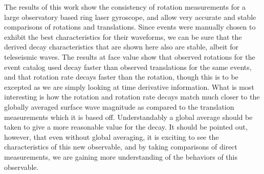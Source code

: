 \documentclass{gji}
\begin{document}
The results of this work show the consistency of rotation measurements for a large observatory based ring laser gyroscope, and allow very accurate and stable comparisons of rotations and translations. Since events were manually chosen to exhibit the best characteristics for their waveforms, we can be sure that the derived decay characteristics that are shown here also are stable, albeit for teleseismic waves. The results at face value show that observed rotations for the event catalog used decay faster than observed translations for the same events, and that rotation rate decays faster than the rotation, though this is to be excepted as we are simply looking at time derivative information. What is most interesting is how the rotation and rotation rate decays match much closer to the globally averaged surface wave magnitude as compared to the translation measurements which it is based off. Understandably a global average should be taken to give a more reasonable value for the decay. It should be pointed out, however, that even without global averaging, it is exciting to see the characteristics of this new observable, and by taking comparisons of direct measurements, we are gaining more understanding of the behaviors of this observable.
\end{document}
